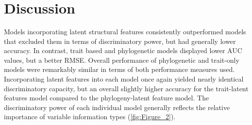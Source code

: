 \documentclass[num-refs]{article}%
\begin{document}
\section*{Discussion}
\paragraph*{}
Models incorporating latent structural features consistently outperformed models that excluded them in terms of discriminatory power, but had generally lower accuracy. In contrast, trait based and phylogenetic models displayed lower AUC values, but a better RMSE. Overall performance of phylogenetic and trait-only models were remarkably similar in terms of both performance measures used. Incorporating latent features into each model once again yielded nearly identical discriminatory  capacity, but an overall slightly higher accuracy for the trait-latent features model compared to the phylogeny-latent feature model. The discriminatory power of each individual model generally reflects the relative importance of variable information types (\ref{fig:Figure_2}). 
\end{document}
